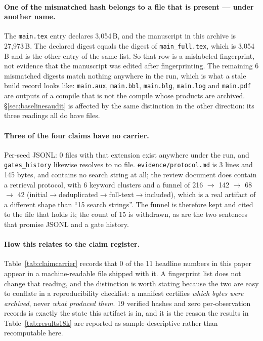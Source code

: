 \paragraph{One of the mismatched hash belongs to a file that is present --- under another name.} The \texttt{main.tex} entry declares 3{,}054\,B, and the manuscript in this archive is 27{,}973\,B. The declared digest equals the digest of \texttt{main\_full.tex}, which is 3{,}054\,B and is the other entry of the same list. So that row is a mislabeled fingerprint, not evidence that the manuscript was edited after fingerprinting. The remaining 6 mismatched digests match nothing anywhere in the run, which is what a stale build record looks like: \texttt{main.aux}, \texttt{main.bbl}, \texttt{main.blg}, \texttt{main.log} and \texttt{main.pdf} are outputs of a compile that is not the compile whose products are archived. \S\ref{sec:baselinesaudit} is affected by the same distinction in the other direction: its three readings all do have files.

\paragraph{Three of the four claims have no carrier.} Per-seed JSONL: 0 files with that extension exist anywhere under the run, and \texttt{gates\_history} likewise resolves to no file. \texttt{evidence/protocol.md} is 3 lines and 145 bytes, and contains no search string at all; the review document does contain a retrieval protocol, with 6 keyword clusters and a funnel of 216 $\to$ 142 $\to$ 68 $\to$ 42 (initial$\to$deduplicated$\to$full-text$\to$included), which is a real artifact of a different shape than ``15 search strings''. The funnel is therefore kept and cited to the file that holds it; the count of 15 is withdrawn, as are the two sentences that promise JSONL and a gate history.

\paragraph{How this relates to the claim register.}\label{sec:claimcarrierlink} Table~\ref{tab:claimcarrier} records that 0 of the 11 headline numbers in this paper appear in a machine-readable file shipped with it. A fingerprint list does not change that reading, and the distinction is worth stating because the two are easy to conflate in a reproducibility checklist: a manifest certifies \emph{which bytes were archived}, never \emph{what produced them}. 19 verified hashes and zero per-observation records is exactly the state this artifact is in, and it is the reason the results in Table~\ref{tab:results18k} are reported as sample-descriptive rather than recomputable here.

